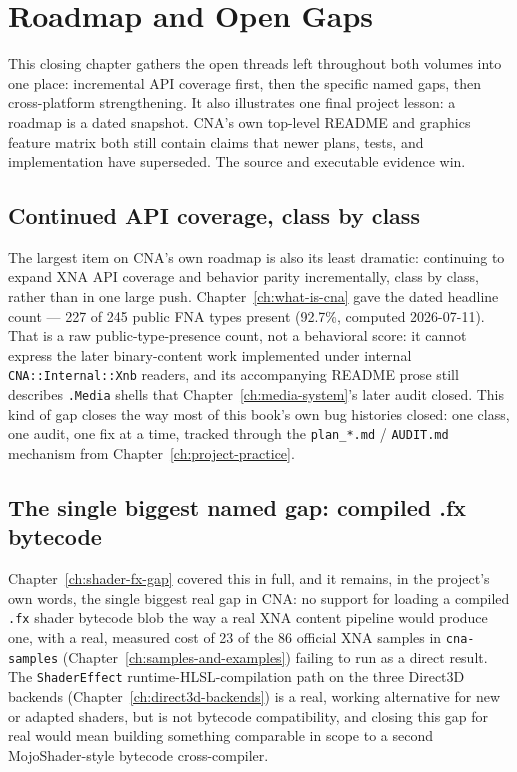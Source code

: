 \chapter{Roadmap and Open Gaps}
\label{ch:roadmap}

This closing chapter gathers the open threads left throughout both volumes into one place:
incremental API coverage first, then the specific named gaps, then cross-platform
strengthening. It also illustrates one final project lesson: a roadmap is a dated snapshot.
CNA's own top-level README and graphics feature matrix both still contain claims that newer
plans, tests, and implementation have superseded. The source and executable evidence win.

\section{Continued API coverage, class by class}

The largest item on CNA's own roadmap is also its least dramatic: continuing to expand XNA
API coverage and behavior parity incrementally, class by class, rather than in one large
push. Chapter~\ref{ch:what-is-cna} gave the dated headline count --- 227 of 245 public FNA
types present (92.7\%, computed 2026-07-11). That is a raw public-type-presence count, not a
behavioral score: it cannot express the later binary-content work implemented under internal
\texttt{CNA::Internal::Xnb} readers, and its accompanying README prose still describes
\texttt{.Media} shells that Chapter~\ref{ch:media-system}'s later audit closed. This kind of
gap closes the way most of this book's own bug histories closed: one class, one audit, one
fix at a time, tracked through the \texttt{plan\_*.md} / \texttt{AUDIT.md} mechanism from
Chapter~\ref{ch:project-practice}.

\section{The single biggest named gap: compiled .fx bytecode}

Chapter~\ref{ch:shader-fx-gap} covered this in full, and it remains, in the
project's own words, the single biggest real gap in CNA: no support for loading a compiled
\texttt{.fx} shader bytecode blob the way a real XNA content pipeline would produce one, with
a real, measured cost of 23 of the 86 official XNA samples in \texttt{cna-samples}
(Chapter~\ref{ch:samples-and-examples}) failing to run as a direct result. The
\texttt{ShaderEffect} runtime-HLSL-compilation path on the three Direct3D backends
(Chapter~\ref{ch:direct3d-backends}) is a real, working alternative for new or adapted
shaders, but is not bytecode compatibility, and closing this gap for real would mean building
something comparable in scope to a second MojoShader-style bytecode cross-compiler.

